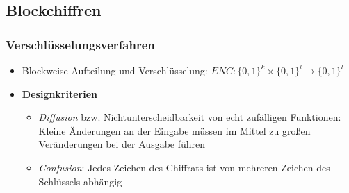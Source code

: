 \subsection{Blockchiffren}

\subsubsection{Verschlüsselungsverfahren}
\begin{itemize}
	\item Blockweise Aufteilung und Verschlüsselung: \(ENC: \big\{0,1\big\}^k \times \big\{0,1\big\}^l \rightarrow \big\{0,1\big\}^l\)
	\item \textbf{Designkriterien}
	\begin{itemize}
		\item \textit{Diffusion} bzw. Nichtunterscheidbarkeit von echt zufälligen Funktionen: Kleine Änderungen an der Eingabe müssen im Mittel zu großen Veränderungen bei der Ausgabe führen
		\item \textit{Confusion}: Jedes Zeichen des Chiffrats ist von mehreren Zeichen des Schlüssels abhängig
	\end{itemize}
\end{itemize}

